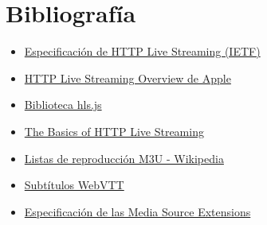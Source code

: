 \section{Bibliografía}\label{bibliografuxeda}

\begin{itemize}
\tightlist
\item
  \href{https://datatracker.ietf.org/doc/draft-pantos-http-live-streaming/}{Especificación
  de HTTP Live Streaming (IETF)}
\item
  \href{https://developer.apple.com/library/content/documentation/NetworkingInternet/Conceptual/StreamingMediaGuide/Introduction/Introduction.html}{HTTP
  Live Streaming Overview de Apple}
\item
  \href{https://github.com/dailymotion/hls.js}{Biblioteca hls.js}
\item
  \href{https://web.archive.org/web/20150507134022/http://www.larryjordan.biz/app_bin/wordpress/archives/2369}{The
  Basics of HTTP Live Streaming}
\item
  \href{https://en.m.wikipedia.org/wiki/M3U}{Listas de reproducción M3U
  - Wikipedia}
\item
  \href{https://w3c.github.io/webvtt/}{Subtítulos WebVTT}
\item
  \href{https://www.w3.org/TR/media-source/}{Especificación de las Media
  Source Extensions}
\end{itemize}
